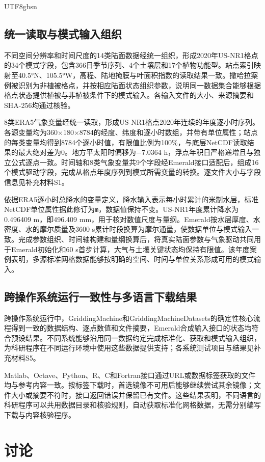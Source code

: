 \documentclass[numdoi]{chinese}
\begin{document}
\begin{CJK}{UTF8}{gbsn}
\subsection{统一读取与模式输入组织}
不同空间分辨率和时间尺度的14类陆面数据经统一组织，形成2020年US-NR1格点的34个模式字段，包含366日季节序列、4个土壤层和17个植物功能型。站点索引映射至40.5°N、105.5°W，高程、陆地掩膜与叶面积指数的读取结果一致。撒哈拉案例被识别为非植被格点，并按相应陆面状态组织参数，说明同一数据集合能够根据格点状态提供植被与非植被条件下的模式输入。各输入文件的大小、来源摘要和SHA-256均通过核验。

8类ERA5气象变量经统一读取，形成US-NR1格点2020年连续的年度逐小时序列。各源变量均为360\ensuremath{\times}180\ensuremath{\times}8784的经度、纬度和逐小时数组，并带有单位属性；站点的每类变量均得到8784个逐小时值，有限值比例为100\%，与底层NetCDF读取结果的最大绝对差为0。地方平太阳时偏移为\ensuremath{-}7.0364 h，浮点年积日严格递增且与独立公式逐点一致。时间轴和8类气象变量共9个字段经Emerald接口适配后，组成16个模式驱动字段，完成从格点年度序列到模式所需变量的转换。逐文件大小与字段信息见补充材料S1。

依据ERA5逐小时总降水的变量定义\cite{ref8}，降水输入表示每小时累计的米制水层，标准NetCDF单位属性据此修订为\nolinkurl{m}，数据值保持不变。US-NR1年度累计降水为0.496409 m，即496.409 mm，用于核对数值尺度与量纲。Emerald按水层厚度、水密度、水的摩尔质量及3600 s累计时段换算为摩尔通量，使数据单位与模式输入一致。完成参数组织、时间轴构建和量纲换算后，将真实陆面参数与气象驱动共同用于Emerald初始化和60 s首步计算，大气与土壤关键状态均保持有限值。该年度案例表明，多源标准网格数据能够按明确的空间、时间与单位关系形成可用的模式输入。

\subsection{跨操作系统运行一致性与多语言下载结果}
跨操作系统运行中，GriddingMachine和GriddingMachineDatasets的确定性核心流程得到一致的数据结构、逐点数值和文件摘要，Emerald合成输入接口的状态均符合预设结果。不同系统能够沿用同一数据约定完成标准化、获取和模式输入组织，为科研程序在不同运行环境中使用这些数据提供支持；各系统测试项目与结果见补充材料S5。

Matlab、Octave、Python、R、C和Fortran接口通过URL或数据标签获取的文件均与参考内容一致。按标签下载时，首选镜像不可用后能够继续尝试其余镜像；文件大小或摘要不符时，接口返回错误并保留已有文件。这些结果表明，不同语言的科研程序可以共用数据目录和核验规则，自动获取标准化网格数据，无需分别编写下载与内容核验程序。

\section{讨论}

\end{CJK}
\end{document}

